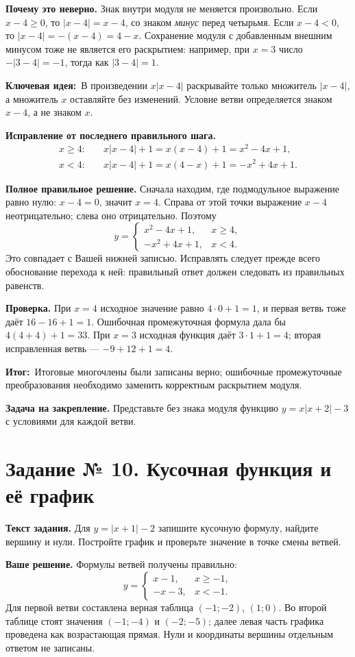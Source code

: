 \documentclass[12pt,a4paper]{article}
\newcommand{\idea}{\textcolor{blue!60!black}{\textbf{Ключевая идея:}}}
\newcommand{\outcome}{\textcolor{teal!60!black}{\textbf{Итог:}}}
\begin{document}
\textbf{Почему это неверно.} Знак внутри модуля не меняется произвольно. Если $x-4\geqslant0$, то $|x-4|=x-4$, со знаком \emph{минус} перед четырьмя. Если $x-4<0$, то $|x-4|=-(x-4)=4-x$. Сохранение модуля с добавленным внешним минусом тоже не является его раскрытием: например, при $x=3$ число $-|3-4|=-1$, тогда как $|3-4|=1$.

\idea\ В произведении $x|x-4|$ раскрывайте только множитель $|x-4|$, а множитель $x$ оставляйте без изменений. Условие ветви определяется знаком $x-4$, а не знаком $x$.

\textbf{Исправление от последнего правильного шага.}
\[
\begin{aligned}
x\geqslant4:&\quad x|x-4|+1=x(x-4)+1=x^2-4x+1,\\
x<4:&\quad x|x-4|+1=x(4-x)+1=-x^2+4x+1.
\end{aligned}
\]

\textbf{Полное правильное решение.} Сначала находим, где подмодульное выражение равно нулю: $x-4=0$, значит $x=4$. Справа от этой точки выражение $x-4$ неотрицательно; слева оно отрицательно. Поэтому
\[
\boxed{y=\begin{cases}
x^2-4x+1,&x\geqslant4,\\
-x^2+4x+1,&x<4.
\end{cases}}
\]
Это совпадает с Вашей нижней записью. Исправлять следует прежде всего обоснование перехода к ней: правильный ответ должен следовать из правильных равенств.

\textbf{Проверка.} При $x=4$ исходное значение равно $4\cdot0+1=1$, и первая ветвь тоже даёт $16-16+1=1$. Ошибочная промежуточная формула дала бы $4(4+4)+1=33$. При $x=3$ исходная функция даёт $3\cdot1+1=4$; вторая исправленная ветвь --- $-9+12+1=4$.

\outcome\ Итоговые многочлены были записаны верно; ошибочные промежуточные преобразования необходимо заменить корректным раскрытием модуля.

\textbf{Задача на закрепление.} Представьте без знака модуля функцию $y=x|x+2|-3$ с условиями для каждой ветви.

\clearpage
{}\label{task:10}
\section*{Задание № 10. Кусочная функция и её график}
\textbf{Текст задания.} Для $y=|x+1|-2$ запишите кусочную формулу, найдите вершину и нули. Постройте график и проверьте значение в точке смены ветвей.

\textbf{Ваше решение.} Формулы ветвей получены правильно:
\[
y=\begin{cases}x-1,&x\geqslant-1,\\-x-3,&x<-1.\end{cases}
\]
Для первой ветви составлена верная таблица $(-1;-2)$, $(1;0)$. Во второй таблице стоят значения $(-1;-4)$ и $(-2;-5)$; далее левая часть графика проведена как возрастающая прямая. Нули и координаты вершины отдельным ответом не записаны.
\end{document}
